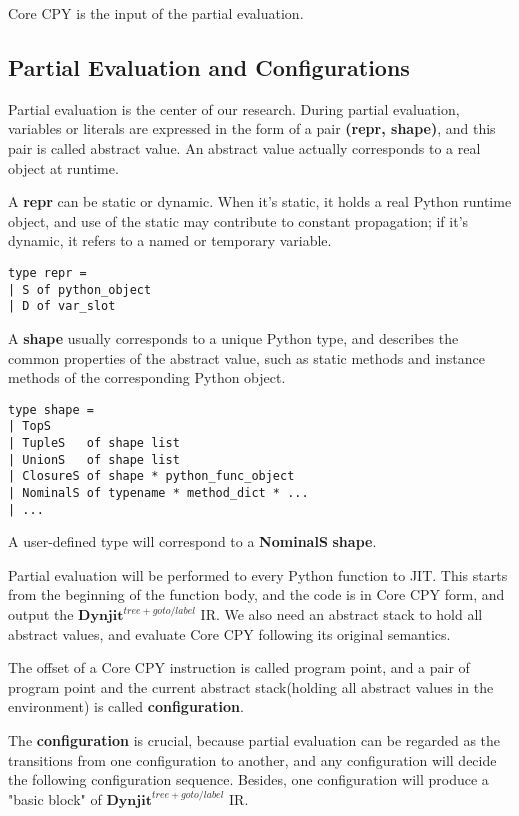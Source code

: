 \documentclass[conference]{IEEEtran}
\begin{document}
Core CPY is the input of the partial evaluation.

\subsection{Partial Evaluation and Configurations}

Partial evaluation is the center of our research.
During partial evaluation, variables or literals are expressed in the form of a pair \textbf{(repr, shape)}, and this pair is called abstract value.
An abstract value actually corresponds to a real object at runtime.

A \textbf{repr} can be static or dynamic. When it's static, it holds a real Python runtime object, and use of the static  may
contribute to constant propagation; if it's dynamic, it refers to a named or temporary variable.

\lstset{language=Caml, showlines=true, mathescape=true}
\begin{lstlisting}[caption=Dynjit repr]
type repr =
| S of python_object
| D of var_slot
\end{lstlisting}

A \textbf{shape} usually corresponds to a unique Python type, and describes the common properties of the abstract value,
such as static methods and instance methods of the corresponding Python object.

\lstset{language=Caml, showlines=true, mathescape=true}
\begin{lstlisting}[caption=Dynjit Shapes]
type shape =
| TopS
| TupleS   of shape list
| UnionS   of shape list
| ClosureS of shape * python_func_object
| NominalS of typename * method_dict * ...
| ...
\end{lstlisting}

A user-defined type will correspond to a \textbf{NominalS} \textbf{shape}.

Partial evaluation will be performed to every Python function to JIT. This starts from the beginning
of the function body, and the code is in Core CPY form, and output the $\mathbf{Dynjit}^{tree+goto/label}$ IR.
We also need an abstract stack to hold all abstract values, and evaluate Core CPY following its original semantics.

The offset of a Core CPY instruction is called program point, and a pair of program point and the current abstract stack(holding all abstract values in the environment)
is called \textbf{configuration}.

The \textbf{configuration} is crucial, because partial evaluation can be regarded as the transitions from one configuration to another,
and any configuration will decide the following configuration sequence. Besides, one configuration will produce a
"basic block" of $\mathbf{Dynjit}^{tree+goto/label}$ IR.
\end{document}
